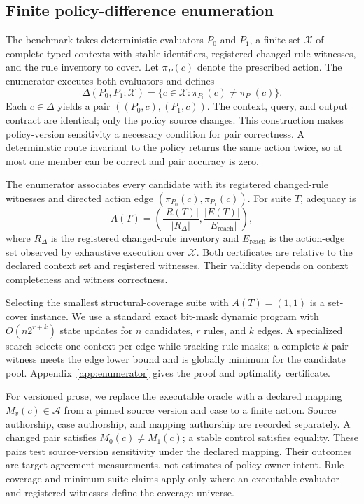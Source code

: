 \documentclass[10pt]{article}
\begin{document}
\subsection{Finite policy-difference enumeration}

The benchmark takes deterministic evaluators $P_0$ and $P_1$, a finite set $\mathcal X$ of complete
typed contexts with stable identifiers, registered changed-rule witnesses, and the rule inventory
to cover. Let $\pi_P(c)$ denote the prescribed action. The enumerator executes both evaluators and
defines
\[
\Delta(P_0,P_1;\mathcal X)=
\{c\in\mathcal X:\pi_{P_0}(c)\neq\pi_{P_1}(c)\}.
\]
Each $c\in\Delta$ yields a pair $((P_0,c),(P_1,c))$. The context, query, and output contract are
identical; only the policy source changes. This construction makes policy-version sensitivity a
necessary condition for pair correctness. A deterministic route invariant to the policy returns
the same action twice, so at most one member can be correct and pair accuracy is zero.

The enumerator associates every candidate with its registered changed-rule witnesses and directed action
edge $(\pi_{P_0}(c),\pi_{P_1}(c))$. For suite $T$, adequacy is
\[
A(T)=\left(\frac{|R(T)|}{|R_\Delta|},
             \frac{|E(T)|}{|E_{\mathrm{reach}}|}\right),
\]
where $R_\Delta$ is the registered changed-rule inventory and $E_{\mathrm{reach}}$ is the action-edge
set observed by exhaustive execution over $\mathcal X$. Both certificates are relative to the
declared context set and registered witnesses. Their validity depends on context completeness
and witness correctness.

Selecting the smallest structural-coverage suite with $A(T)=(1,1)$ is a set-cover instance. We use a standard exact
bit-mask dynamic program with $O(n2^{r+k})$ state updates for $n$ candidates, $r$ rules, and $k$
edges. A specialized search selects one context per edge while tracking rule masks; a complete
$k$-pair witness meets the edge lower bound and is globally minimum for the candidate pool.
Appendix~\ref{app:enumerator} gives the proof and optimality certificate.

For versioned prose, we replace the executable oracle with a declared mapping
$M_v(c)\in\mathcal A$ from a pinned source version and case to a finite action. Source authorship,
case authorship, and mapping authorship are recorded separately. A changed pair satisfies
$M_0(c)\neq M_1(c)$; a stable control satisfies equality. These pairs test source-version
sensitivity under the declared mapping. Their outcomes are target-agreement measurements, not
estimates of policy-owner intent. Rule-coverage and minimum-suite claims apply only where an
executable evaluator and registered witnesses define the coverage universe.
\end{document}
